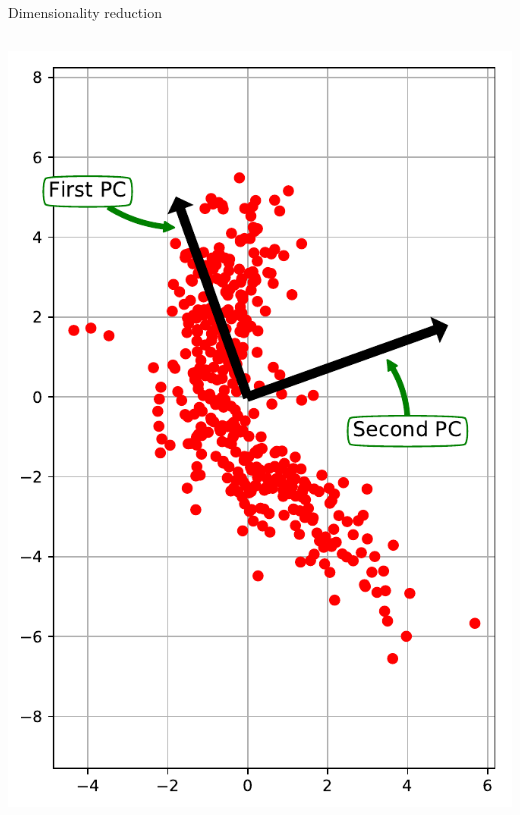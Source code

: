 \documentclass[10pt, aspectratio=169]{beamer} %
\begin{document}
\begin{frame}[fragile, allowframebreaks=0.8]{Dimensionality reduction}
\begin{columns}
		\begin{center}
			\includegraphics[width=\columnwidth]{PCA_example.pdf}
		\end{center}
		\end{columns}
\end{frame}
\end{document}
